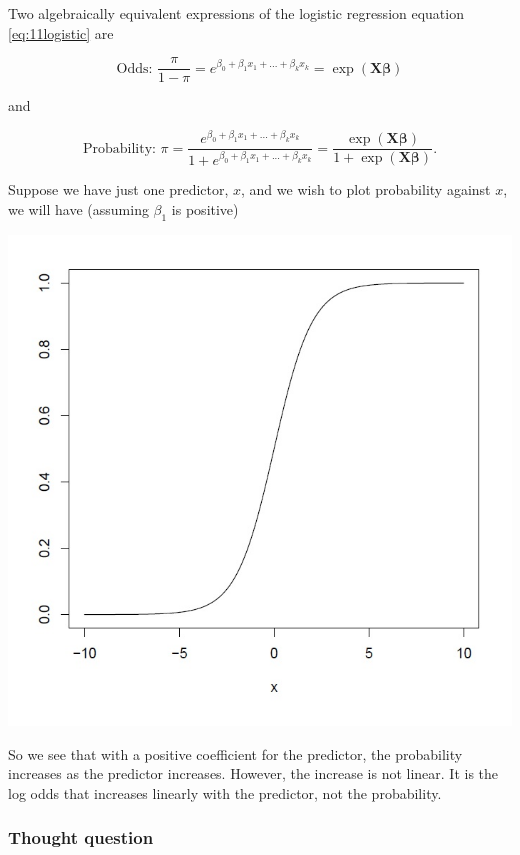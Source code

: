 \documentclass[
]{book}
\begin{document}
Two algebraically equivalent expressions of the logistic regression equation \eqref{eq:11logistic} are

\begin{equation} 
\text{Odds: }\frac{\pi}{1-\pi}=e^{\beta_0+\beta_1x_1+...+\beta_{k} x_{k}} = \exp(\boldsymbol{X \beta})
\label{eq:11odds}
\end{equation}

and

\begin{equation} 
\text{Probability: }\pi=\frac{e^{\beta_0+\beta_1x_1+...+\beta_{k} x_{k}}}{1+e^{\beta_0+\beta_1x_1+...+\beta_{k} x_{k}}} = \frac{\exp(\boldsymbol{X \beta})}{1+\exp(\boldsymbol{X \beta})}.
\label{eq:11prob}
\end{equation}

Suppose we have just one predictor, \(x\), and we wish to plot probability against \(x\), we will have (assuming \(\beta_1\) is positive)

\includegraphics{images/graph.jpg}

So we see that with a positive coefficient for the predictor, the probability increases as the predictor increases. However, the increase is not linear. It is the log odds that increases linearly with the predictor, not the probability.

\hypertarget{thought-question-1}{%
\subsubsection{Thought question}\label{thought-question-1}}
\end{document}
